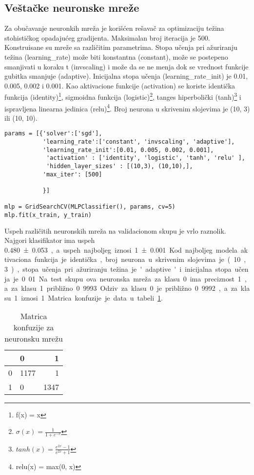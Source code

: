 \documentclass[a4paper]{article}
\begin{document}
\subsection{Veštačke neuronske mreže}
Za obučavanje neuronkih mreža je korišćen rešavač za optimizaciju težina stohističkog opadajućeg gradijenta.  Maksimalan broj iteracija je 500. Konstruisane su mreže sa različitim parametrima. Stopa učenja pri ažuriranju težina (learning\_rate) može biti konstantna (constant), može se postepeno smanjivati u koraku t (invscaling) i može da se ne menja dok se vrednost funkcije gubitka smanjuje (adaptive). Inicijalna stopa učenja (learning\_rate\_init) je 0.01, 0.005, 0.002 i 0.001. Kao aktivacione funkcije (activation) se koriste identička funkcija (identity)\footnote{f(x) = x}, sigmoidna funkcija (logistic)\footnote{$\sigma (x) =  \frac{1}{1 + e^{-x}} $}, tanges hiperbolički (tanh)\footnote{$tanh(x) = \frac{e^{2x} - 1}{e^{2x} + 1} $} i ispravljena linearna jedinica (relu)\footnote{relu(x) = max(0, x)}. Broj neurona u skrivenim slojevima je (10, 3) ili (10, 10).

\begin{lstlisting}[caption={Obučavanje neuronskih mreža},frame=single, label=simple]
params = [{'solver':['sgd'],
           'learning_rate':['constant', 'invscaling', 'adaptive'],
           'learning_rate_init':[0.01, 0.005, 0.002, 0.001],
            'activation' : ['identity', 'logistic', 'tanh', 'relu' ],
            'hidden_layer_sizes' : [(10,3), (10,10),],
           'max_iter': [500]

           }]

mlp = GridSearchCV(MLPClassifier(), params, cv=5)
mlp.fit(x_train, y_train)
\end{lstlisting}

Uspeh različitih neuronskih mreža na validacionom skupu je vrlo raznolik. Najgori klasifikator ima uspeh \SI{0.480 \pm 0.053}, a uspeh najboljeg iznosi \SI{1 \pm 0.001}. Kod najboljeg modela aktivaciona funkcija je identička, broj neurona u skrivenim slojevima je (10, 3), stopa učenja pri ažuriranju težina je 'adaptive' i inicijalna stopa učenja je 0.01. Na test skupu ova neuronska mreža za klasu 0 ima preciznost 1, a za klasu 1 približno 0.9993. Odziv za klasu 0 je približno 0.9992, a za klasu 1 iznosi 1. Matrica konfuzije je data u tabeli \ref{tab:matKonfMLP}.

\begin{table}[h!]
\begin{center}
\caption{Matrica konfuzije za neuronsku mrežu}
\begin{tabular}{|c|l|r|} \hline
& 0& 1\\ \hline
0 &1177&1\\ \hline
1 &0&1347\\ \hline
\end{tabular}
\label{tab:matKonfMLP}
\end{center}
\end{table}
\end{document}
